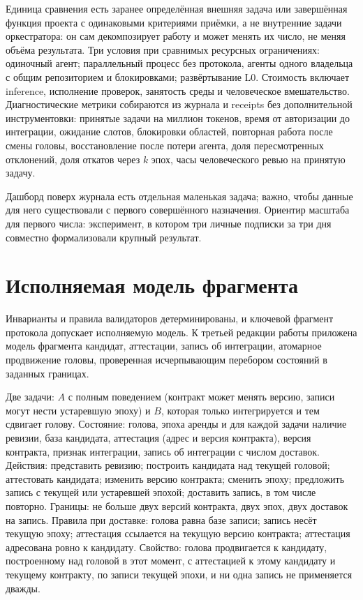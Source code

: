  Единица сравнения есть заранее определённая внешняя задача или завершённая функция проекта с одинаковыми критериями приёмки, а не внутренние задачи оркестратора: он сам декомпозирует работу и может менять их число, не меняя объёма результата. Три условия при сравнимых ресурсных ограничениях: одиночный агент; параллельный процесс без протокола, агенты одного владельца с общим репозиторием и блокировками; развёртывание L0. Стоимость включает inference, исполнение проверок, занятость среды и человеческое вмешательство. Диагностические метрики собираются из журнала и receipts без дополнительной инструментовки: принятые задачи на миллион токенов, время от авторизации до интеграции, ожидание слотов, блокировки областей, повторная работа после смены головы, восстановление после потери агента, доля пересмотренных отклонений, доля откатов через $k$ эпох, часы человеческого ревью на принятую задачу.

Дашборд поверх журнала есть отдельная маленькая задача; важно, чтобы данные для него существовали с первого совершённого назначения. Ориентир масштаба для первого числа: эксперимент, в котором три личные подписки за три дня совместно формализовали крупный результат.

\section{Исполняемая модель фрагмента}

Инварианты и правила валидаторов детерминированы, и ключевой фрагмент протокола допускает исполняемую модель. К третьей редакции работы приложена модель фрагмента кандидат, аттестации, запись об интеграции, атомарное продвижение головы, проверенная исчерпывающим перебором состояний в заданных границах.

\begin{exbox}
Две задачи: $A$ с полным поведением (контракт может менять версию, записи могут нести устаревшую эпоху) и $B$, которая только интегрируется и тем сдвигает голову. Состояние: голова, эпоха аренды и для каждой задачи наличие ревизии, база кандидата, аттестация (адрес и версия контракта), версия контракта, признак интеграции, запись об интеграции с числом доставок. Действия: представить ревизию; построить кандидата над текущей головой; аттестовать кандидата; изменить версию контракта; сменить эпоху; предложить запись с текущей или устаревшей эпохой; доставить запись, в том числе повторно. Границы: не больше двух версий контракта, двух эпох, двух доставок на запись. Правила при доставке: голова равна базе записи; запись несёт текущую эпоху; аттестация ссылается на текущую версию контракта; аттестация адресована ровно к кандидату. Свойство: голова продвигается к кандидату, построенному над головой в этот момент, с аттестацией к этому кандидату и текущему контракту, по записи текущей эпохи, и ни одна запись не применяется дважды.
\end{exbox}

